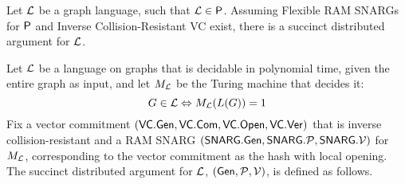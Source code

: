 \begin{theorem}\label{theo:P}
Let $\mathcal{L}$ be a graph language, such that $\mathcal{L}\in {\mathsf{P}}$. Assuming Flexible RAM SNARGs for ${\mathsf{P}}$ and Inverse Collision-Resistant VC exist, there is a succinct distributed argument for $\mathcal{L}$.  
\end{theorem}


Let $\mathcal{L}$ be a language on graphs that is decidable in polynomial time, given the entire graph as input, and let $M_{\mathcal{L}}$ be the Turing machine that decides it:
$$G\in \mathcal{L} \Leftrightarrow M_{\mathcal{L}}(L(G)) = 1$$
Fix a vector commitment $(\mathsf{VC}.\mathsf{Gen}, \mathsf{VC}.\mathsf{Com}, \mathsf{VC}.\mathsf{Open}, \mathsf{VC}.\mathsf{Ver})$ that is inverse collision-resistant and a RAM SNARG $(\mathsf{SNARG}.\mathsf{Gen}, \mathsf{SNARG}.\mathcal{P}, \mathsf{SNARG}.\mathcal{V})$ for $M_{\mathcal{L}}$, corresponding to the vector commitment as the hash with local opening. The succinct distributed argument for $\mathcal{L}$, $(\mathsf{Gen}, \mathcal{P}, \mathcal{V})$, is defined as follows.
